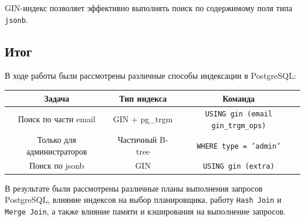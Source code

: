 \documentclass{bmstu-sob}
\begin{document}
	
	GIN-индекс позволяет эффективно выполнять поиск по содержимому
	поля типа \texttt{jsonb}.
	
	\subsection{Итог}
	
	В ходе работы были рассмотрены различные способы индексации
	в PostgreSQL:
	
	\begin{center}
		\begin{tabular}{|c|c|c|}
			\hline
			Задача & Тип индекса & Команда \\
			\hline
			Поиск по части email & GIN + pg\_trgm &
			\texttt{USING gin (email gin\_trgm\_ops)} \\
			\hline
			Только для администраторов & Частичный B-tree &
			\texttt{WHERE type = 'admin'} \\
			\hline
			Поиск по jsonb & GIN &
			\texttt{USING gin (extra)} \\
			\hline
		\end{tabular}
	\end{center}
	
	В результате были рассмотрены различные планы выполнения запросов
	PostgreSQL, влияние индексов на выбор планировщика, работу
	\texttt{Hash Join} и \texttt{Merge Join}, а также влияние памяти
	и кэширования на выполнение запросов.
	
	
\end{document}
